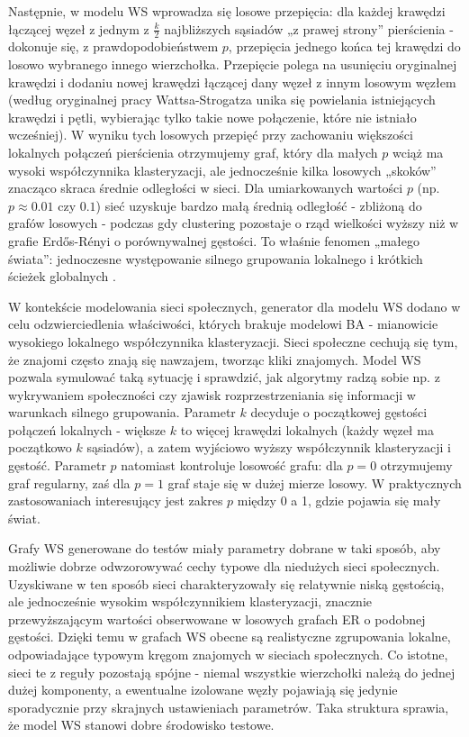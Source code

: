 Następnie, w modelu WS wprowadza się losowe przepięcia: dla każdej krawędzi łączącej węzeł z jednym z $\frac{k}{2}$ najbliższych sąsiadów „z prawej strony” pierścienia - dokonuje się, z prawdopodobieństwem $p$, przepięcia jednego końca tej krawędzi do losowo wybranego innego wierzchołka. Przepięcie polega na usunięciu oryginalnej krawędzi i dodaniu nowej krawędzi łączącej dany węzeł z innym losowym węzłem (według oryginalnej pracy Wattsa-Strogatza unika się powielania istniejących krawędzi i pętli, wybierając tylko takie nowe połączenie, które nie istniało wcześniej). W wyniku tych losowych przepięć przy zachowaniu większości lokalnych połączeń pierścienia otrzymujemy graf, który dla małych $p$ wciąż ma wysoki współczynnika klasteryzacji, ale jednocześnie kilka losowych „skoków” znacząco skraca średnie odległości w sieci. Dla umiarkowanych wartości $p$ (np. $p \approx 0.01$ czy $0.1$) sieć uzyskuje bardzo małą średnią odległość - zbliżoną do grafów losowych - podczas gdy clustering pozostaje o rząd wielkości wyższy niż w grafie Erd\H{o}s-Rényi o porównywalnej gęstości. To właśnie fenomen „małego świata”: jednoczesne występowanie silnego grupowania lokalnego i krótkich ścieżek globalnych \cite{Watts1998}.

W kontekście modelowania sieci społecznych, generator dla modelu WS dodano w celu odzwierciedlenia właściwości, których brakuje modelowi BA - mianowicie wysokiego lokalnego współczynnika klasteryzacji. Sieci społeczne cechują się tym, że znajomi często znają się nawzajem, tworząc kliki znajomych. Model WS pozwala symulować taką sytuację i sprawdzić, jak algorytmy radzą sobie np. z wykrywaniem społeczności czy zjawisk rozprzestrzeniania się informacji w warunkach silnego grupowania. Parametr $k$ decyduje o początkowej gęstości połączeń lokalnych - większe $k$ to więcej krawędzi lokalnych (każdy węzeł ma początkowo $k$ sąsiadów), a zatem wyjściowo wyższy współczynnik klasteryzacji i gęstość. Parametr $p$ natomiast kontroluje losowość grafu: dla $p=0$ otrzymujemy graf regularny, zaś dla $p=1$ graf staje się w dużej mierze losowy. W praktycznych zastosowaniach interesujący jest zakres $p$ między 0 a 1, gdzie pojawia się mały świat.

Grafy WS generowane do testów miały parametry dobrane w taki sposób, aby możliwie dobrze odwzorowywać cechy typowe dla niedużych sieci społecznych. Uzyskiwane w ten sposób sieci charakteryzowały się relatywnie niską gęstością, ale jednocześnie wysokim współczynnikiem klasteryzacji, znacznie przewyższającym wartości obserwowane w losowych grafach ER o podobnej gęstości. Dzięki temu w grafach WS obecne są realistyczne zgrupowania lokalne, odpowiadające typowym kręgom znajomych w sieciach społecznych. Co istotne, sieci te z reguły pozostają spójne - niemal wszystkie wierzchołki należą do jednej dużej komponenty, a ewentualne izolowane węzły pojawiają się jedynie sporadycznie przy skrajnych ustawieniach parametrów. Taka struktura sprawia, że model WS stanowi dobre środowisko testowe.


